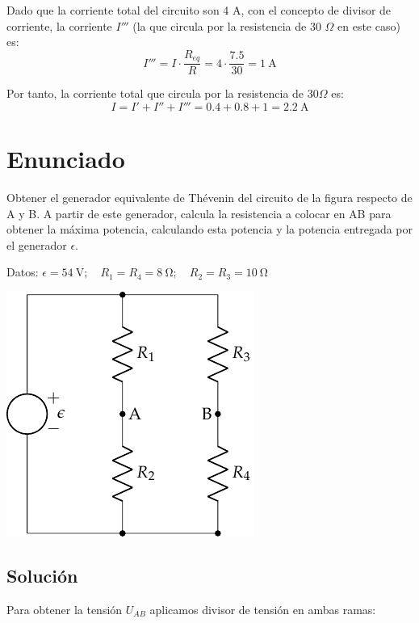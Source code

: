 Dado que la corriente total del circuito son 4 A, con el concepto de
divisor de corriente, la corriente $I'''$ (la que circula por la
resistencia de 30 $\Omega$ en este caso) es:
\begin{equation*}
  I'''=I\cdot \dfrac{R_{eq}}{R}=4\cdot\dfrac{7.5}{30}=\qty{1}{\ampere}
\end{equation*}

Por tanto, la corriente total que circula por la resistencia de
$30\Omega$ es:
\begin{equation*}
  I=I'+I''+I'''=0.4+0.8+1=\qty{2.2}{\ampere}
\end{equation*}

\section{Enunciado}
Obtener el generador equivalente de Thévenin del circuito de la figura
respecto de A y B. A partir de este generador, calcula la resistencia
a colocar en AB para obtener la máxima potencia, calculando esta
potencia y la potencia entregada por el generador $\epsilon$.

Datos:
$\epsilon = \qty{54}{\volt};\quad R_1 = R_4 = \qty{8}{\ohm};\quad R_2
= R_3 = \qty{10}{\ohm}$

\begin{center}
  \includegraphics{figuras/Thevenin2}
\end{center}

    
\subsection*{Solución}
Para obtener la tensión $U_{AB}$ aplicamos divisor de tensión en ambas
ramas:

